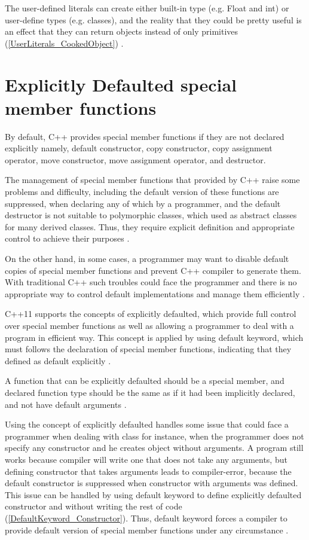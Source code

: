 \documentclass[11pt]{report}
\begin{document}
The user-defined literals can create either built-in type (e.g.  Float and int) or user-define types (e.g. classes), and the reality that they could be pretty useful is an effect that they can return objects instead of only primitives (\ref{UserLiterals_CookedObject}) \cite{Gregorie:professionalcpp}.


\section{Explicitly Defaulted special member functions}
\label{section: Defaulted special member functions}
By default, C++ provides special member functions if they are not declared explicitly namely, default constructor, copy constructor, copy assignment operator, move constructor, move assignment operator, and destructor.


The management of special member functions that provided by C++ raise some problems and difficulty, including the default version of these functions are suppressed, when declaring any of which by a programmer, and the default destructor is not suitable to polymorphic classes, which used as abstract classes for many derived classes. Thus, they require explicit definition and appropriate control to achieve their purposes \cite{ISO:2011:Cpplanguage}.


On the other hand, in some cases, a programmer may want to disable default copies of special member functions and prevent C++ compiler to generate them. With traditional C++ such troubles could face the programmer and there is no appropriate way to control default implementations and manage them efficiently \cite{ISO:2011:Cpplanguage}.


C++11 supports the concepts of explicitly defaulted, which provide full control over special member functions as well as allowing a programmer to deal with a program in efficient way. This concept is applied by using default keyword, which must follows the declaration of special member functions, indicating that they defined as default explicitly \cite{Prata:2012:Cpp}.


A function that can be explicitly defaulted should be a special member, and declared function type should be the same as if it had been implicitly declared, and not have default arguments \cite{ISO:2011:Cpplanguage}.


Using the concept of explicitly defaulted handles some issue that could face a programmer when dealing with class for instance, when the programmer does not specify any constructor and he creates object without arguments. A program still works because compiler will write one that does not take any arguments, but defining constructor that takes arguments leads to compiler-error, because the default constructor is suppressed when constructor with arguments was defined. This issue can be handled by using default keyword to define explicitly defaulted constructor and without writing the rest of code (\ref{DefaultKeyword_Constructor}). Thus, default keyword forces a compiler to provide default version of special member functions under any circumstance \cite{Gregorie:professionalcpp}.
\end{document}
